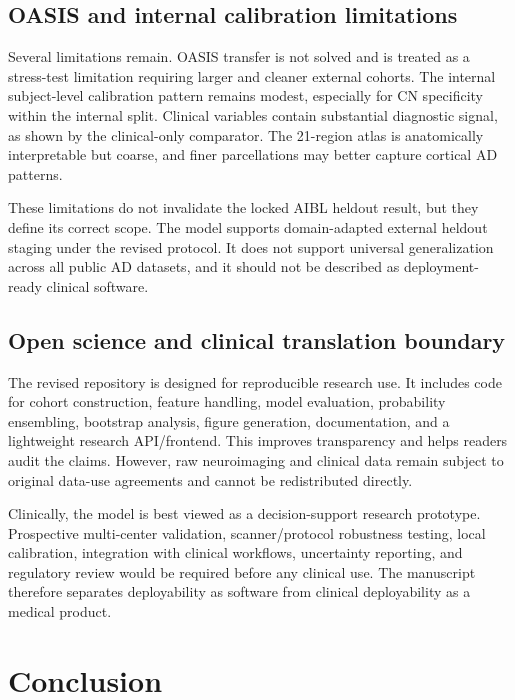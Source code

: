 \documentclass[12pt,a4paper]{article}
\begin{document}
\subsection{OASIS and internal calibration limitations}
\label{sec:discussion_limitations}

Several limitations remain. OASIS transfer is not solved and is treated as a stress-test limitation requiring larger and cleaner external cohorts. The internal subject-level calibration pattern remains modest, especially for CN specificity within the internal split. Clinical variables contain substantial diagnostic signal, as shown by the clinical-only comparator. The 21-region atlas is anatomically interpretable but coarse, and finer parcellations may better capture cortical AD patterns.

These limitations do not invalidate the locked AIBL heldout result, but they define its correct scope. The model supports domain-adapted external heldout staging under the revised protocol. It does not support universal generalization across all public AD datasets, and it should not be described as deployment-ready clinical software.

\subsection{Open science and clinical translation boundary}
\label{sec:discussion_deployment}

The revised repository is designed for reproducible research use. It includes code for cohort construction, feature handling, model evaluation, probability ensembling, bootstrap analysis, figure generation, documentation, and a lightweight research API/frontend. This improves transparency and helps readers audit the claims. However, raw neuroimaging and clinical data remain subject to original data-use agreements and cannot be redistributed directly.

Clinically, the model is best viewed as a decision-support research prototype. Prospective multi-center validation, scanner/protocol robustness testing, local calibration, integration with clinical workflows, uncertainty reporting, and regulatory review would be required before any clinical use. The manuscript therefore separates deployability as software from clinical deployability as a medical product.


\section{Conclusion}
\label{sec:conclusion}
\end{document}

